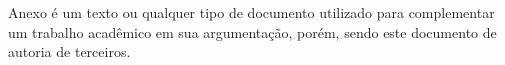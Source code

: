 \label{an:ex_anexo_a}

Anexo é um texto ou qualquer tipo de documento utilizado para complementar um trabalho acadêmico em sua argumentação, porém, sendo este documento de autoria de terceiros.